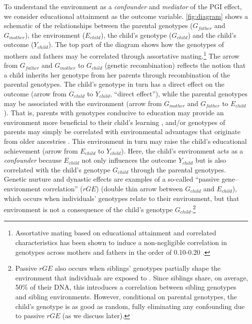 \documentclass[12pt,a4paper]{article}
\begin{document}
\begin{bibunit}
To understand the environment as a \textit{confounder} and \textit{mediator} of the PGI effect, we consider educational attainment as the outcome variable. \autoref{fig:diagram} shows a schematic of the relationships between the parental genotypes ($G_{father}$ and $G_{mother}$), the environment ($E_{child}$), the child's genotype ($G_{child}$) and the child's outcome ($Y_{child}$). The top part of the diagram shows how the genotypes of mothers and fathers may be correlated through assortative mating.\footnote{Assortative mating based on educational attainment and correlated characteristics has been shown to induce a non-negligible correlation in genotypes across mothers and fathers in the order of 0.10-0.20 \citep[e.g.,][]{robinson2017genetic,morris2020population,torvik2022modeling,collado2023estimating}.} The arrow from $G_{father}$ and $G_{mother}$ to $G_{child}$ (genetic recombination) reflects the notion that a child inherits her genotype from her parents through recombination of the parental genotypes. The child's genotype in turn has a direct effect on the outcome (arrow from $G_{child}$ to $Y_{child}$, ``direct effect''), while the parental genotypes may be associated with the environment (arrow from $G_{mother}$ and $G_{father}$ to $E_{child}$). That is, parents with genotypes conducive to education may provide an environment more beneficial to their child's learning \citep[so-called genetic nurture;][]{Bates2018,Kong2018,Wertz2018}, and/or genotypes of parents may simply be correlated with environmental advantages that originate from older ancestries \citep[so-called dynastic effects,][]{nivard2024more}. This environment in turn may raise the child's educational achievement (arrow from $E_{child}$ to $Y_{child}$). Here, the child's environment acts as a \textit{confounder} because $E_{child}$ not only influences the outcome $Y_{child}$ but is also correlated with the child's genotype $G_{child}$ through the parental genotypes. Genetic nurture and dynastic effects are examples of a so-called ``passive gene--environment correlation'' ($rGE$) (double thin arrow between $G_{child}$ and $E_{child}$), which occurs when individuals' genotypes relate to their environment, but that environment is not a consequence of the child's genotype $G_{child}$.\footnote{Passive $rGE$ also occurs when siblings' genotypes partially shape the environment that individuals are exposed to \citep[e.g.,][]{cawley2019testing}. Since siblings share, on average, 50\% of their DNA, this introduces a correlation between sibling genotypes and sibling environments. However, conditional on parental genotypes, the child's genotype is as good as random, fully eliminating any confounding due to passive $rGE$ (as we discuss later).} 


\end{bibunit}
\end{document}
